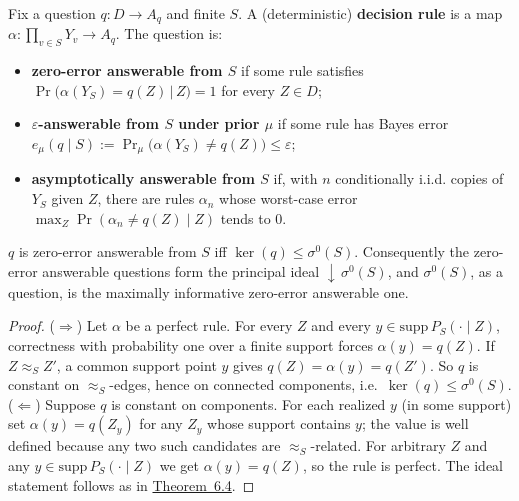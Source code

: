 \begin{thmdef}

Fix a question \(q : D \to A_q\) and finite \(S\). A (deterministic) \textbf{decision rule} is a map \(\alpha : \prod_{v\in S} Y_v \to A_q\). The question is:

\begin{itemize}
\tightlist
\item
  \textbf{zero-error answerable from \(S\)} if some rule satisfies \(\Pr\big(\alpha(Y_S) = q(Z) \,\big|\, Z\big) = 1\) for every \(Z \in D\);
\item
  \textbf{\(\varepsilon\)-answerable from \(S\) under prior \(\mu\)} if some rule has Bayes error \(e_\mu(q \mid S) := \Pr_{\mu}\big(\alpha(Y_S) \ne q(Z)\big) \le \varepsilon\);
\item
  \textbf{asymptotically answerable from \(S\)} if, with \(n\) conditionally i.i.d. copies of \(Y_S\) given \(Z\), there are rules \(\alpha_n\) whose worst-case error \(\max_{Z} \Pr(\alpha_n \ne q(Z) \mid Z)\) tends to \(0\).
\end{itemize}
\end{thmdef}

\begin{thmplain}

\(q\) is zero-error answerable from \(S\) iff \(\ker(q) \le \sigma^{0}(S)\). Consequently the zero-error answerable questions form the principal ideal \({\downarrow}\,\sigma^{0}(S)\), and \(\sigma^0(S)\), as a question, is the maximally informative zero-error answerable one.
\end{thmplain}

\begin{proof}

(\(\Rightarrow\)) Let \(\alpha\) be a perfect rule. For every \(Z\) and every \(y \in \mathrm{supp}\,P_S(\cdot \mid Z)\), correctness with probability one over a finite support forces \(\alpha(y) = q(Z)\). If \(Z \approx_S Z'\), a common support point \(y\) gives \(q(Z) = \alpha(y) = q(Z')\). So \(q\) is constant on \(\approx_S\)-edges, hence on connected components, i.e.~\(\ker(q) \le \sigma^0(S)\). (\(\Leftarrow\)) Suppose \(q\) is constant on components. For each realized \(y\) (in some support) set \(\alpha(y) = q(Z_y)\) for any \(Z_y\) whose support contains \(y\); the value is well defined because any two such candidates are \(\approx_S\)-related. For arbitrary \(Z\) and any \(y \in \mathrm{supp}\,P_S(\cdot\mid Z)\) we get \(\alpha(y) = q(Z)\), so the rule is perfect. The ideal statement follows as in \hyperlink{stmt:6.4}{Theorem~6.4}.
\end{proof}

